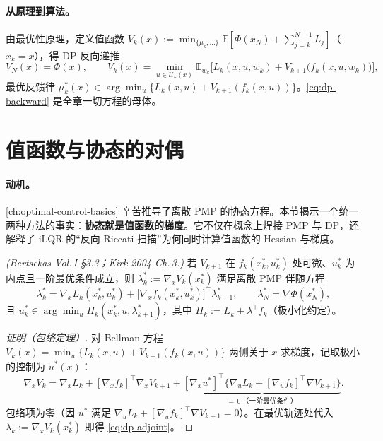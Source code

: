 \paragraph{从原理到算法。}
由最优性原理，定义值函数 $V_k(x):=\min_{\{\mu_k,\dots\}}\mathbb E[\Phi(x_N)+\sum_{j=k}^{N-1}L_j]$（$x_k=x$），得 DP 反向递推
\begin{equation}
  V_N(x)=\Phi(x),\qquad
  V_k(x)=\min_{u\in\mathcal U_k(x)}\mathbb E_{w_k}\big[L_k(x,u,w_k)+V_{k+1}\big(f_k(x,u,w_k)\big)\big],
  \label{eq:dp-backward}
\end{equation}
最优反馈律 $\mu_k^*(x)\in\arg\min_u\{L_k(x,u)+V_{k+1}(f_k(x,u))\}$。\cref{eq:dp-backward} 是全章一切方程的母体。

\section{值函数与协态的对偶}
\label{sec:dp-costate}

\paragraph{动机。}
\cref{ch:optimal-control-basics} 辛苦推导了离散 PMP 的协态方程。本节揭示一个统一两种方法的事实：\textbf{协态就是值函数的梯度}。它不仅在概念上焊接 PMP 与 DP，还解释了 iLQR 的“反向 Riccati 扫描”为何同时计算值函数的 Hessian 与梯度。

\begin{theorem}[协态 = 值函数梯度]\label{thm:dp-costate}
\emph{(Bertsekas Vol.\,I §3.3\cite{bertsekas2017dpoc1}；Kirk 2004\cite{kirk2004optimal} Ch.\,3.)}
若 $V_{k+1}$ 在 $f_k(x_k^*,u_k^*)$ 处可微、$u_k^*$ 为内点且一阶最优条件成立，则 $\lambda_k^*:=\nabla_x V_k(x_k^*)$ 满足离散 PMP 伴随方程
\begin{equation}
  \lambda_k^*=\nabla_x L_k(x_k^*,u_k^*)+\big[\nabla_x f_k(x_k^*,u_k^*)\big]^\top\lambda_{k+1}^*,
  \qquad \lambda_N^*=\nabla\Phi(x_N^*),
  \label{eq:dp-adjoint}
\end{equation}
且 $u_k^*\in\arg\min_u H_k(x_k^*,u,\lambda_{k+1}^*)$，其中 $H_k:=L_k+\lambda^\top f_k$（极小化约定）。
\end{theorem}

\begin{proof}[证明（包络定理）]
对 Bellman 方程 $V_k(x)=\min_u\{L_k(x,u)+V_{k+1}(f_k(x,u))\}$ 两侧关于 $x$ 求梯度，记取极小的控制为 $u^*(x)$：
\[
\nabla_x V_k=\nabla_x L_k+[\nabla_x f_k]^\top\nabla_x V_{k+1}
  +\underbrace{[\nabla_x u^*]^\top\big\{\nabla_u L_k+[\nabla_u f_k]^\top\nabla V_{k+1}\big\}}_{=\,0\ \text{（一阶最优条件）}}.
\]
包络项为零（因 $u^*$ 满足 $\nabla_u L_k+[\nabla_u f_k]^\top\nabla V_{k+1}=0$）。在最优轨迹处代入 $\lambda_k:=\nabla_x V_k(x_k^*)$ 即得 \cref{eq:dp-adjoint}。
\end{proof}

